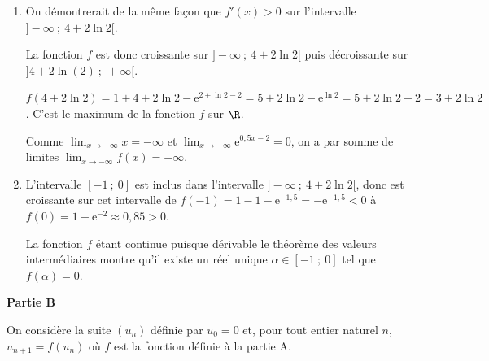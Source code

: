 \begin{enumerate}
\begin{enumerate}
$f'(x) = 1 - 0,5\text{e}^{0,5x - 2}$.
		\item 
On a dans $\R$,

$f'(x) < 0 \iff 1 - 0,5\text{e}^{0,5x - 2} < 0 \iff 1 < 0,5\text{e}^{0,5x - 2} \iff 2 < \text{e}^{0,5x - 2}$. par croissance sur $\R_{+}^*$ de la fonction logarithme népérien $ \ln 2 < 0,5x - 2 \iff 2 + \ln 2 < 0,5x \iff 4 + 2\ln 2 < x$.

Conclusion : $S = ]4 + 2\ln (2)~;~+\infty[$

	\end{enumerate}
\item 
On démontrerait de la même façon que $f'(x) > 0$ sur l'intervalle $]- \infty~;~4 + 2\ln 2[$.

La fonction $f$ est donc croissante sur $]- \infty~;~4 + 2\ln 2[$ puis décroissante sur $]4 + 2\ln (2)~;~+\infty[$.

$f\left(4 + 2\ln 2 \right) = 1 + 4 + 2\ln 2 - \text{e}^{2 + \ln 2 - 2} = 5 + 2\ln 2 - \text{e}^{\ln 2} = 5 + 2\ln 2 - 2 = 3 + 2\ln 2$. C'est le maximum de la fonction $f$ sur $\R$.

Comme $\displaystyle\lim_{x \to - \infty} x = - \infty$ et $\displaystyle\lim_{x \to - \infty} \text{e}^{0,5x - 2} = 0$, on a par somme de limites  $\displaystyle\lim_{x \to - \infty} f(x) = - \infty$.
\item 
L'intervalle $[-1~;~0]$ est inclus dans l'intervalle $]- \infty~;~4 + 2\ln 2[$, donc est croissante sur cet intervalle de $f(-1) = 1 - 1 - \text{e}^{-1,5} = - \text{e}^{-1,5} < 0$ à $f(0) = 1 - \text{e}^{-2} \approx 0,85 > 0$.

La fonction $f$ étant continue puisque dérivable le théorème des valeurs intermédiaires montre qu'il existe un réel unique $\alpha \in[-1~;~0]$ tel que $f(\alpha) = 0$.
\end{enumerate}

\bigskip

\textbf{Partie B}

\medskip

On considère la suite $\left(u_n\right)$ définie par $u_0 = 0$ et, pour tout entier naturel $n$,
\: $u_{n+1} = f\left(u_n\right)$ où $f$ est la fonction définie à la partie A.

\medskip

